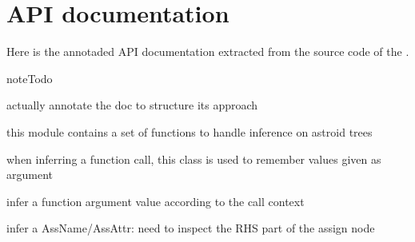 \documentclass[letterpaper,10pt,english]{sphinxmanual}
\begin{document}
\section{API documentation}
\label{inference:api-documentation}
Here is the annotaded API documentation extracted from the source code
of the {\hyperref[inference:module-inference]{}}.

\begin{notice}{note}{Todo}

actually annotate the doc to structure its approach
\end{notice}
\label{inference:module-inference}
this module contains a set of functions to handle inference on astroid trees

\begin{fulllineitems}
\label{inference:inference.CallContext}
when inferring a function call, this class is used to remember values
given as argument

\begin{fulllineitems}
\label{inference:inference.CallContext.infer_argument}
infer a function argument value according to the call context

\end{fulllineitems}


\end{fulllineitems}


\begin{fulllineitems}
\label{inference:inference.infer_arguments}
\end{fulllineitems}


\begin{fulllineitems}
\label{inference:inference.infer_ass}
infer a AssName/AssAttr: need to inspect the RHS part of the
assign node

\end{fulllineitems}
\end{document}
